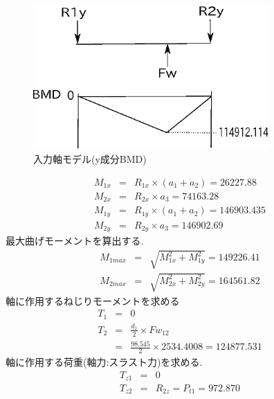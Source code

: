 \begin{figure}[htbp]
\begin{center}
\includegraphics[width=9cm]{../picture/jiku13.eps}
\end{center}
\caption{入力軸モデル(y成分BMD)}
\end{figure}
\begin{eqnarray}
M_{1x} &=& R_{1x} \times (a_1+a_2)=26227.88\\
M_{2x} &=& R_{2x} \times a_3=74163.28\\
M_{1y} &=& R_{1y} \times (a_1+a_2)=146903.435\\
M_{2y} &=& R_{2y} \times a_3=146902.69
\end{eqnarray}
最大曲げモーメントを算出する.
\begin{eqnarray}
M_{1max} &=& \sqrt {M_{1x}^2+M_{1y}^2}=149226.41\\
M_{2max} &=& \sqrt {M_{2x}^2+M_{2y}^2}=164561.82
\end{eqnarray}
軸に作用するねじりモーメントを求める
\begin{eqnarray}
T_{1} &=& 0\\
T_{2} &=& \frac{d_1}{2} \times Fw_{12}\\
      &=& \frac{98.545}{2} \times 2534.4008 = 124877.531
\end{eqnarray}
軸に作用する荷重(軸力:スラスト力)を求める.
\begin{eqnarray}
T_{z1} &=& 0\\
T_{z2} &=& R_{2z} = P_{t1} = 972.870
\end{eqnarray}






\newpage
